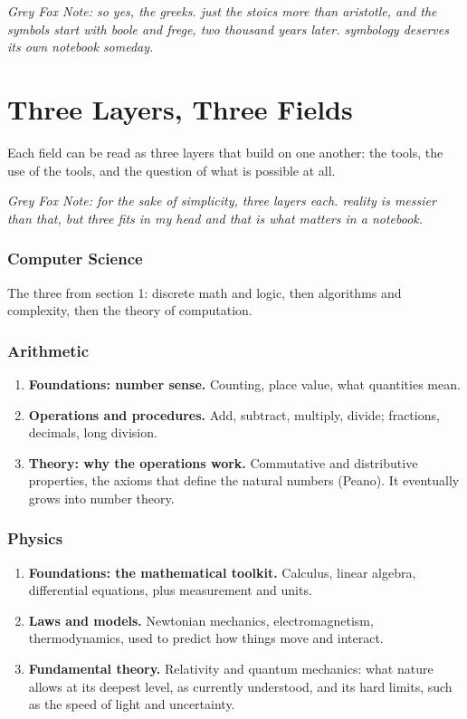 \documentclass[11pt,a4paper]{article}
\newcommand{\gfnote}[1]{\par{\itshape Grey Fox Note: #1}\par}
\begin{document}
\newpage %
\gfnote{so yes, the greeks. just the stoics more than aristotle, and the symbols start
with boole and frege, two thousand years later. symbology deserves its own notebook
someday.}

\section{Three Layers, Three Fields}

Each field can be read as three layers that build on one another: the tools, the use of the tools,
and the question of what is possible at all.

\gfnote{for the sake of simplicity, three layers each. reality is messier than that, but
three fits in my head and that is what matters in a notebook.}

\subsubsection*{Computer Science}
The three from section 1: discrete math and logic, then algorithms and complexity, then the
theory of computation.

\subsubsection*{Arithmetic}
\begin{enumerate}
  \item \textbf{Foundations: number sense.} Counting, place value, what quantities mean.
  \item \textbf{Operations and procedures.} Add, subtract, multiply, divide; fractions, decimals, long
        division.
  \item \textbf{Theory: why the operations work.} Commutative and distributive properties, the axioms
        that define the natural numbers (Peano). \cite{peano} It eventually grows into number theory.
\end{enumerate}

\subsubsection*{Physics}
\begin{enumerate}
  \item \textbf{Foundations: the mathematical toolkit.} Calculus, linear algebra, differential equations,
        plus measurement and units.
  \item \textbf{Laws and models.} Newtonian mechanics, electromagnetism, thermodynamics, used to
        predict how things move and interact.
  \item \textbf{Fundamental theory.} Relativity and quantum mechanics: what nature allows at its
        deepest level, as currently understood, and its hard limits, such as the speed of light and
        uncertainty.
\end{enumerate}
\end{document}
